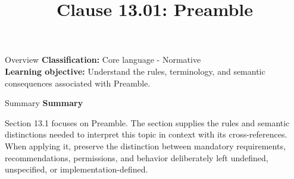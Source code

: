 \documentclass[10pt,letterpaper]{article}
\title{Clause 13.01: Preamble}
\author{}
\date{}
\begin{document}
\maketitle
\begin{CornellOverviewBox}{Overview}
\textbf{Classification:} Core language - Normative\\[2pt]
\textbf{Learning objective:} Understand the rules, terminology, and semantic consequences associated with Preamble.
\end{CornellOverviewBox}\begin{CornellSummaryBox}{Summary}
{\sffamily\bfseries\color{Accent} Summary}\par\vspace{3pt}Section 13.1 focuses on Preamble. The section supplies the rules and semantic distinctions needed to interpret this topic in context with its cross-references. When applying it, preserve the distinction between mandatory requirements, recommendations, permissions, and behavior deliberately left undefined, unspecified, or implementation-defined.
\end{CornellSummaryBox}
\end{document}
